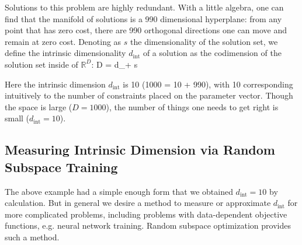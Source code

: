 \documentclass{article} %
\newcommand{\dint}{d_{\mathrm{int}}}
\begin{document}
Solutions to this problem are highly redundant. With a little algebra, one can find that the manifold of solutions is a 990 dimensional hyperplane: from any point that has zero cost, there are 990 orthogonal directions one can move and remain at zero cost. Denoting as $s$ the dimensionality of the solution set, we define the intrinsic dimensionality $\dint$ of a solution as the codimension of the solution set inside of $\mathbb{R}^D$:
\beq
D = \dint + s
\eeq


Here the intrinsic dimension $\dint$ is 10 (1000 = 10 + 990), with 10 corresponding intuitively to the number of constraints placed on the parameter vector. Though the space is large ($D = 1000$), the number of things one needs to get right is small ($\dint = 10$).


\subsection{Measuring Intrinsic Dimension via Random Subspace Training}

The above example had a simple enough form that we obtained $\dint = 10$ by calculation. But in general we desire a method to measure or approximate $\dint$ for more complicated problems, including problems with data-dependent objective functions, e.g. neural network training.
Random subspace optimization provides such a method.
\end{document}

